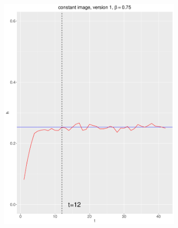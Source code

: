 \documentclass[12pt, oneside]{article}   	%
\begin{document}
\begin{figure}[H]
\begin{subfigure}[b]{0.475\textwidth}
            \includegraphics[width=\textwidth, height=0.32\textheight]{const_v1_75.pdf}
        \end{subfigure}
        \quad
        \begin{subfigure}[b]{0.475\textwidth}
            \centering

\end{subfigure}
\end{figure}
\end{document}
